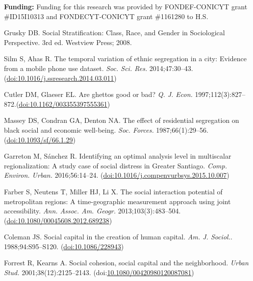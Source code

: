 \documentclass[%
preprint,
 amsmath,amssymb,
pra,
]{revtex4-1}
\begin{document}
\bigskip
\noindent
\textbf{Funding:} Funding for this research was provided by FONDEF-CONICYT grant \#ID15I10313 and  FONDECYT-CONICYT grant \#1161280 to H.S.







\begin{thebibliography}{10}

Grusky DB. Social Stratification: Class, Race, and Gender in Sociological Perspective. 3rd ed. Westview Press; 2008.

Silm S, Ahas R. The temporal variation of ethnic segregation in a city: Evidence from a mobile phone use dataset. \emph{Soc. Sci. Res.} 2014;47:30--43.(\href{https://dx.doi.org/10.1016/j.ssresearch.2014.03.011}{doi:10.1016/j.ssresearch.2014.03.011})

Cutler DM, Glaeser EL. Are ghettos good or bad? \emph{Q. J. Econ.} 1997;112(3):827--872.(\href{https://dx.doi.org/10.1162/003355397555361}{doi:10.1162/003355397555361})

Massey DS, Condran GA, Denton NA. The effect of residential segregation on black social and economic well-being. \emph{Soc. Forces.} 1987;66(1):29--56.(\href{https://dx.doi.org/10.1093/sf/66.1.29}{doi:10.1093/sf/66.1.29})

Garreton M, S{\'{a}}nchez R. Identifying an optimal analysis level in multiscalar
  regionalization: A study case of social distress in Greater Santiago.
\emph{Comp. Environ. Urban.} 2016;56:14--24. (\href{https://dx.doi.org/10.1016/j.compenvurbsys.2015.10.007}{doi:10.1016/j.compenvurbsys.2015.10.007})

Farber S, Neutens T, Miller HJ, Li X. The social interaction potential of metropolitan regions: A time-geographic measurement approach using joint accessibility. \emph{Ann. Assoc. Am. Geogr.} 2013;103(3):483--504. (\href{https://dx.doi.org/10.1080/00045608.2012.689238}{doi:10.1080/00045608.2012.689238})

Coleman JS. Social capital in the creation of human capital. \emph{Am. J. Sociol.}. 1988;94:S95--S120. (\href{https://dx.doi.org/10.1086/228943}{doi:10.1086/228943})

Forrest R, Kearns A. Social cohesion, social capital and the neighborhood.
\emph{Urban Stud.} 2001;38(12):2125--2143. (doi:\href{https://dx.doi.org/10.1080/00420980120087081}{10.1080/00420980120087081})


\end{thebibliography}
\end{document}
